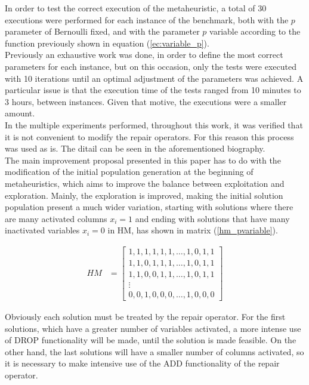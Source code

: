 In order to test the correct execution of the metaheuristic, a total of 30 executions were performed for each instance of the benchmark, both with the $p$ parameter of Bernoulli fixed, and with the parameter $p$ variable according to the function previously shown in equation (\ref{ec:variable_p}).\\

Previously an exhaustive work was done, in order to define the most correct parameters for each instance, but on this occasion, only the tests were executed with 10 iterations until an optimal adjustment of the parameters was achieved. A particular issue is that the execution time of the tests ranged from 10 minutes to 3 hours, between instances. Given that motive, the executions were a smaller amount.\\

In the multiple experiments performed, throughout this work, it was verified that it is not convenient to modify the repair operators. For this reason this 
process was used as is. The ditail can be seen in the aforementioned biography.\\

The main improvement proposal presented in this paper has to do with the modification of the initial population generation at the beginning of metaheuristics, which aims to improve the balance between exploitation and exploration. Mainly, the exploration is improved, making the initial solution population present a much wider variation, starting with solutions where there are many activated columns $x_i = 1$ and ending with solutions that have many inactivated variables $x_i = 0$ in HM, has shown in matrix (\ref{hm_pvariable}).

\begin{align}
    	HM &= \begin{bmatrix}  1,1,1,1,1,1, \ldots,1,0,1,1\\
    			     	1,1,0,1,1,1, \ldots,1,0,1,1 \\ 
                              	1,1,0,0,1,1, \ldots, 1,0,1,1 \\
				\vdots \\
    			     	0,0,1,0,0,0, \ldots,1,0,0,0 
	\end{bmatrix}
	\label{hm_pvariable}
\end{align}

Obviously each solution must be treated by the repair operator. For the first solutions, which have a greater number of variables activated, a more intense use of DROP functionality will be made, until the solution is made feasible. On the other hand, the last solutions will have a smaller number of columns activated, so it is necessary to make intensive use of the ADD functionality of the repair operator.\\

